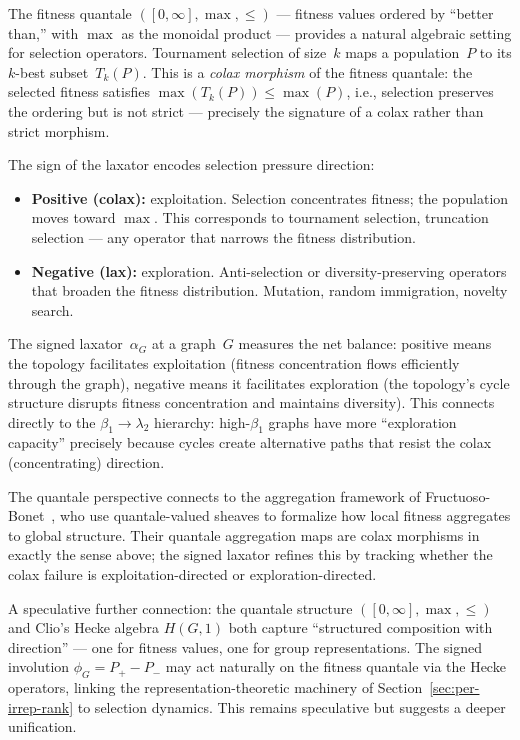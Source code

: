 \begin{remark}
\label{rem:quantale-morphism}
The fitness quantale $([0,\infty], \max, \leq)$ --- fitness values
ordered by ``better than,'' with $\max$ as the monoidal product ---
provides a natural algebraic setting for selection operators.
Tournament selection of size~$k$ maps a population~$P$ to its
$k$-best subset~$T_k(P)$.  This is a \emph{colax morphism} of the
fitness quantale: the selected fitness satisfies
$\max(T_k(P)) \leq \max(P)$, i.e., selection preserves the ordering
but is not strict --- precisely the signature of a colax rather than
strict morphism.

The sign of the laxator encodes selection pressure direction:
\begin{itemize}
\item \textbf{Positive (colax):} exploitation.  Selection concentrates
  fitness; the population moves toward $\max$.  This corresponds to
  tournament selection, truncation selection --- any operator that
  narrows the fitness distribution.
\item \textbf{Negative (lax):} exploration.  Anti-selection or
  diversity-preserving operators that broaden the fitness distribution.
  Mutation, random immigration, novelty search.
\end{itemize}
The signed laxator~$\alpha_G$ at a graph~$G$ measures the net balance:
positive means the topology facilitates exploitation (fitness
concentration flows efficiently through the graph), negative means it
facilitates exploration (the topology's cycle structure disrupts fitness
concentration and maintains diversity).  This connects directly to the
$\beta_1 \to \lambda_2$ hierarchy: high-$\beta_1$ graphs have more
``exploration capacity'' precisely because cycles create alternative
paths that resist the colax (concentrating) direction.

The quantale perspective connects to the aggregation framework of
Fructuoso-Bonet~\cite{fructuoso2026quantale}, who use quantale-valued
sheaves to formalize how local fitness aggregates to global structure.
Their quantale aggregation maps are colax morphisms in exactly the
sense above; the signed laxator refines this by tracking whether the
colax failure is exploitation-directed or exploration-directed.

A speculative further connection: the quantale structure
$([0,\infty], \max, \leq)$ and Clio's Hecke algebra $H(G,1)$ both
capture ``structured composition with direction'' --- one for fitness
values, one for group representations.  The signed involution
$\phi_G = P_+ - P_-$ may act naturally on the fitness quantale via
the Hecke operators, linking the representation-theoretic machinery
of Section~\ref{sec:per-irrep-rank} to selection dynamics.  This
remains speculative but suggests a deeper unification.
\end{remark}

